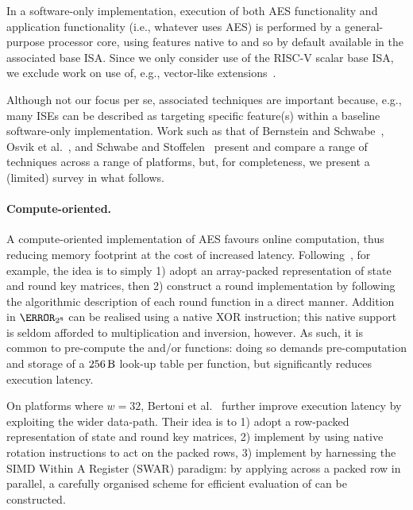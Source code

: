 
In a software-only implementation,
execution of 
both
AES         functionality
and
application functionality (i.e., whatever uses AES)
is 
performed by 
a general-purpose processor core, using features native to and so by default available in the associated base ISA.
Since we only consider use of the RISC-V scalar base ISA, we exclude work on
use of, e.g., vector-like extensions~\cite{Hamburg:09}.

Although not our focus per se, associated techniques are important because, 
e.g., many ISEs can be described as targeting specific feature(s) within a 
baseline software-only implementation.
Work such as that of
Bernstein and Schwabe~\cite{BerSch:08},
Osvik et al.~\cite{OBSC:10},
and
Schwabe and Stoffelen~\cite{SchSto:16}
present and compare a range of techniques across a range of platforms, but,
for completeness, we present a (limited) survey in what follows.


\paragraph{Compute-oriented.}

A compute-oriented implementation of AES favours
 online     computation, 
thus reducing 
memory footprint
at the cost of increased 
latency.
Following~\cite[Section 4.1]{DaeRij:02}, for example, the idea is to simply
1) adopt an
    array-packed
   representation of state and round key matrices,
   then
2) construct a round implementation by following the algorithmic description
   of each round function in a direct manner.
Addition in $\F_{2^8}$ can be realised using a native XOR instruction; this
native support is seldom afforded to multiplication and inversion, however.
As such, it is common to pre-compute the  and/or  
functions:
doing so demands pre-computation and storage of a
$
\SI{256}{\byte}
$
look-up table per function, but significantly reduces execution latency.

On platforms where $w = 32$,
Bertoni et al.~\cite{BBFMM:02}
further improve execution latency by exploiting the wider data-path.  Their
idea is to
1) adopt a 
      row-packed
   representation of state and round key matrices,
2) implement
   by using native rotation instructions to act on the packed
   rows,
3) implement
   by harnessing the SIMD Within A Register (SWAR) paradigm:
   by applying
   across a packed row in parallel,
   a carefully organised scheme for efficient evaluation of
   can be constructed.

